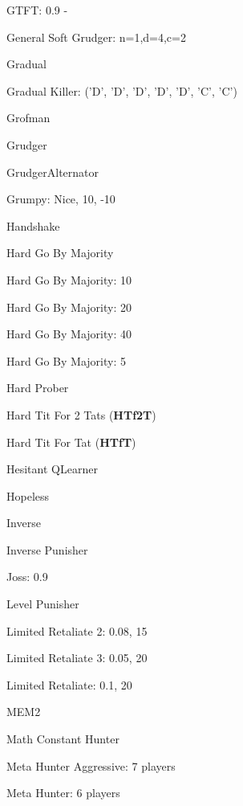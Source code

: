 \item GTFT: 0.9 -
\item General Soft Grudger: n=1,d=4,c=2~\cite{axelrodproject}
\item Gradual~\cite{Beaufils1997}
\item Gradual Killer: ('D', 'D', 'D', 'D', 'D', 'C', 'C')~\cite{prison}
\item Grofman\cite{Axelrod1980a}
\item Grudger~\cite{Axelrod1980a, Banks1990, Beaufils1997, Van2015, Li2011}
\item GrudgerAlternator~\cite{prison}
\item Grumpy: Nice, 10, -10~\cite{axelrodproject}
\item Handshake~\cite{Robson1990}
\item Hard Go By Majority~\cite{Mittal2009}
\item Hard Go By Majority: 10~\cite{axelrodproject}
\item Hard Go By Majority: 20~\cite{axelrodproject}
\item Hard Go By Majority: 40~\cite{axelrodproject}
\item Hard Go By Majority: 5~\cite{axelrodproject}
\item Hard Prober~\cite{prison}
\item Hard Tit For 2 Tats (\textbf{HTf2T})~\cite{Stewart2012}
\item Hard Tit For Tat (\textbf{HTfT})~\cite{PD2017}
\item Hesitant QLearner\cite{axelrodproject}
\item Hopeless \cite{Van2015}
\item Inverse\cite{axelrodproject}
\item Inverse Punisher~\cite{axelrodproject}
\item Joss: 0.9 \cite{Axelrod1980a, Stewart2012}
\item Level Punisher~\cite{Eckhart2015}
\item Limited Retaliate 2: 0.08, 15~\cite{axelrodproject}
\item Limited Retaliate 3: 0.05, 20~\cite{axelrodproject}
\item Limited Retaliate: 0.1, 20~\cite{axelrodproject}
\item MEM2~\cite{Li2014}
\item Math Constant Hunter~\cite{axelrodproject}
\item Meta Hunter Aggressive: 7 players~\cite{axelrodproject}
\item Meta Hunter: 6 players~\cite{axelrodproject}
